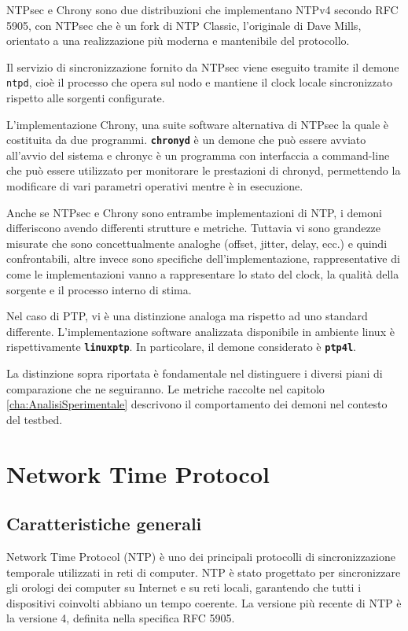 NTPsec e Chrony sono due distribuzioni che implementano NTPv4 secondo RFC 5905,
con NTPsec che è un fork di NTP Classic, l'originale di Dave Mills, orientato a una
realizzazione più moderna e mantenibile del protocollo.\cite{SecureNetworkTime}

Il servizio di sincronizzazione fornito da NTPsec viene eseguito tramite il
demone \texttt{ntpd}, cioè il processo che opera sul nodo e mantiene il clock
locale sincronizzato rispetto alle sorgenti configurate.

L'implementazione Chrony, una suite software alternativa di NTPsec la quale è costituita da 
due programmi. \texttt{\textbf{chronyd}} è un demone che può
essere avviato all'avvio del sistema e chronyc è un programma con interfaccia a
command-line che può essere utilizzato per monitorare le prestazioni di chronyd, permettendo la 
modificare di vari parametri operativi mentre è in esecuzione. \cite{ChronyIntroduction}


Anche se NTPsec e Chrony sono entrambe implementazioni di NTP, i demoni differiscono avendo differenti 
strutture e metriche. Tuttavia vi sono grandezze misurate che sono concettualmente analoghe (offset, jitter, delay, ecc.) e quindi confrontabili, 
altre invece sono specifiche dell'implementazione, rappresentative di come le implementazioni 
vanno a rappresentare lo stato del clock, la qualità della sorgente e il processo interno di stima.

Nel caso di PTP, vi è una distinzione analoga ma rispetto ad uno standard
differente. L'implementazione software analizzata disponibile in ambiente linux è
rispettivamente \texttt{\textbf{linuxptp}}. In particolare, il demone
considerato è \texttt{\textbf{ptp4l}}.

La distinzione sopra riportata è fondamentale nel distinguere i diversi piani di comparazione
che ne seguiranno. Le metriche raccolte nel capitolo
\ref{cha:AnalisiSperimentale} descrivono il comportamento dei demoni nel contesto del testbed.

\section{Network Time Protocol}
\subsection{Caratteristiche generali}
Network Time Protocol (NTP) è uno dei principali protocolli di sincronizzazione temporale
utilizzati in reti di computer. NTP è stato progettato per sincronizzare gli
orologi dei computer su Internet e su reti locali, garantendo che tutti i dispositivi
coinvolti abbiano un tempo coerente. La versione più recente di NTP è la
versione 4, definita nella specifica RFC 5905.

